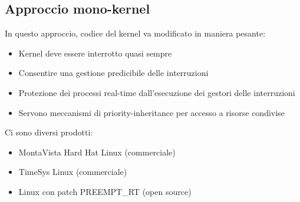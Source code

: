 \documentclass[12pt, oneside]{extbook}
\begin{document}
\subsection{Approccio mono-kernel}
In questo approccio, codice del kernel va modificato in maniera pesante:
\begin{itemize}
\item Kernel deve essere interrotto quasi sempre
\item Consentire una gestione predicibile delle interruzioni
\item Protezione dei processi real-time dall'esecuzione dei gestori delle interruzioni
\item Servono meccanismi di priority-inheritance per accesso a risorse condivise
\end{itemize}
Ci sono diversi prodotti:
\begin{itemize}
\item MontaVista Hard Hat Linux (commerciale)
\item TimeSys Linux (commerciale)
\item Linux con patch PREEMPT\_RT (open source)
\end{itemize}
\end{document}
